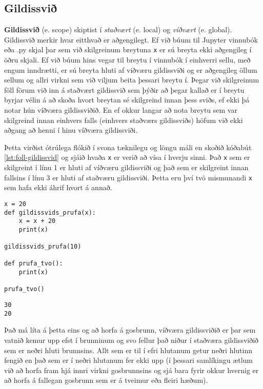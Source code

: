 \subsection{Gildissvið}\label{uk:gildissvið}
\textbf{Gildissvið} (e. scope) skiptist í \textit{staðvært} (e. local) og \textit{víðvært} (e. global). 
Gildissvið merkir hvar eitthvað er aðgengilegt.
Ef við búum til Jupyter vinnubók eða .py skjal þar sem við skilgreinum breytuna \texttt{x} er sú breyta ekki aðgengileg í öðru skjali.
Ef við búum hins vegar til breytu í vinnubók í einhverri sellu, með engum inndrætti, er sú breyta hluti af viðværu gildissviði og er aðgengileg öllum sellum og allri virkni sem við viljum beita þessari breytu í.
Þegar við skilgreinum föll förum við inn á staðvært gildissvið sem þýðir að þegar kallað er í breytu byrjar vélin á að skoða hvort breytan sé skilgreind innan þess sviðs, ef ekki þá notar hún víðværa gildissviðið.
En ef okkur langar að nota breytu sem var skilgreind innan einhvers falls (einhvers staðværs gildissviðs) höfum við ekki aðgang að henni í hinu víðværa gildissviði.

Þetta virðist ótrúlega flókið í svona tæknilegu og löngu máli en skoðið kóðabút \ref{lst:foll-gildissvid} og sjáið hvaða \texttt{x} er verið að vísa í hverju sinni.
Það \texttt{x} sem er skilgreint í línu 1 er hluti af víðværu gildissviði og það sem er skilgreint innan fallsins í línu 3 er hluti af staðværu gildissviði.
Þetta eru því tvö mismunandi \texttt{x} sem hafa ekki áhrif hvort á annað.

\begin{lstlisting}[caption=Gildissvið, label=lst:foll-gildissvid]
x = 20
def gildissvids_prufa(x):
	x = x + 20
	print(x)

gildissvids_prufa(10)

def prufa_tvo():
	print(x)

prufa_tvo()
\end{lstlisting}
\lstset{style=uttak}
\begin{lstlisting}
30
20
\end{lstlisting}
\lstset{style=venjulegt}

Það má líta á þetta eins og að horfa á gosbrunn, víðværa gildissviðið er þar sem vatnið kemur upp efst í brunninum og svo fellur það niður í staðværa gildissviðið sem er neðri hluti brunnsins.
Allt sem er til í efri hlutanum getur neðri hlutinn fengið en það sem er í neðri hlutanum fer ekki upp (í þessari samlíkingu ætlum við að horfa fram hjá innri virkni gosbrunnsins og sjá bara fyrir okkur hvernig er að horfa á fallegan gosbrunn sem er á tveimur eða fleiri hæðum).


